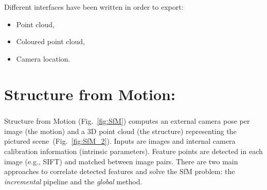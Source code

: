 \documentclass[11pt, letterpaper]{report}
\begin{document}
Different interfaces have been written in order to export:
\begin{itemize}
\item Point cloud,
\item Coloured point cloud,
\item Camera location.
\end{itemize}

\newpage
\chapter{Structure from Motion:}

\paragraph{}
Structure from Motion (Fig.~\ref{fig:SfM}) computes an external camera pose per image (the motion) and a 3D point cloud (the structure) representing the pictured scene~(Fig.~\ref{fig:SfM_2}). Inputs are images and internal camera calibration information (intrinsic parameters). Feature points are detected in each image (e.g., SIFT) and matched between image pairs. There are two main approaches to correlate detected features and solve the SfM problem: the \textit{incremental} pipeline and the \textit{global} method.
\end{document}
